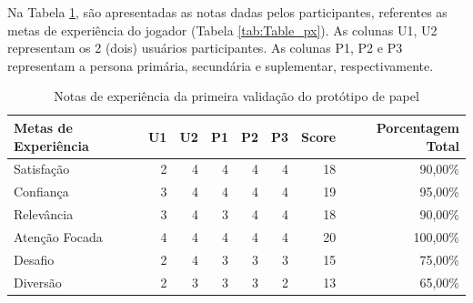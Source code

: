 \begin{apendicesenv}
{Na Tabela \ref{tab:notas-metas-exp-2}, são apresentadas as notas dadas pelos participantes, referentes as metas de experiência do jogador (Tabela \ref{tab:Table_px}). As colunas U1, U2 representam os 2 (dois) usuários participantes. As colunas P1, P2 e P3 representam a persona primária, secundária e suplementar, respectivamente.

\begin{table}[htbp]
\centering
\caption{\textcolor{textadded}{Notas de experiência da primeira validação do protótipo de papel}}
\begin{tabular}{|p{5cm}|r|r|r|r|r|r|r|}
\hline
\textcolor{textadded}{\textbf{Metas de Experiência}} & \textcolor{textadded}{\textbf{U1}} & \textcolor{textadded}{\textbf{U2}} & \textcolor{textadded}{\textbf{P1}} & \textcolor{textadded}{\textbf{P2}} & \textcolor{textadded}{\textbf{P3}} & \textcolor{textadded}{\textbf{Score}} & \textcolor{textadded}{\textbf{Porcentagem Total}}     \\ \hline
\textcolor{textadded}{Satisfação} & \textcolor{textadded}{2} & \textcolor{textadded}{4} & \textcolor{textadded}{4} & \textcolor{textadded}{4} & \textcolor{textadded}{4} & \textcolor{textadded}{18} & \textcolor{textadded}{90,00\%}         \\ \hline
\textcolor{textadded}{Confiança} & \textcolor{textadded}{3} & \textcolor{textadded}{4} & \textcolor{textadded}{4} & \textcolor{textadded}{4} & \textcolor{textadded}{4} & \textcolor{textadded}{19} & \textcolor{textadded}{95,00\%}          \\ \hline
\textcolor{textadded}{Relevância} & \textcolor{textadded}{3} & \textcolor{textadded}{4} & \textcolor{textadded}{3} & \textcolor{textadded}{4} & \textcolor{textadded}{4} & \textcolor{textadded}{18} & \textcolor{textadded}{90,00\%}         \\ \hline
\textcolor{textadded}{Atenção Focada} & \textcolor{textadded}{4} & \textcolor{textadded}{4} & \textcolor{textadded}{4} & \textcolor{textadded}{4} & \textcolor{textadded}{4} & \textcolor{textadded}{20} & \textcolor{textadded}{100,00\%}     \\ \hline
\textcolor{textadded}{Desafio} & \textcolor{textadded}{2} & \textcolor{textadded}{4} & \textcolor{textadded}{3} & \textcolor{textadded}{3} & \textcolor{textadded}{3} & \textcolor{textadded}{15} & \textcolor{textadded}{75,00\%}             \\ \hline
\textcolor{textadded}{Diversão} & \textcolor{textadded}{2} & \textcolor{textadded}{3} & \textcolor{textadded}{3} & \textcolor{textadded}{3} & \textcolor{textadded}{2} & \textcolor{textadded}{13} & \textcolor{textadded}{65,00\%}            \\ \hline
\end{tabular}
\label{tab:notas-metas-exp-2}
\end{table}

}
\end{apendicesenv}
